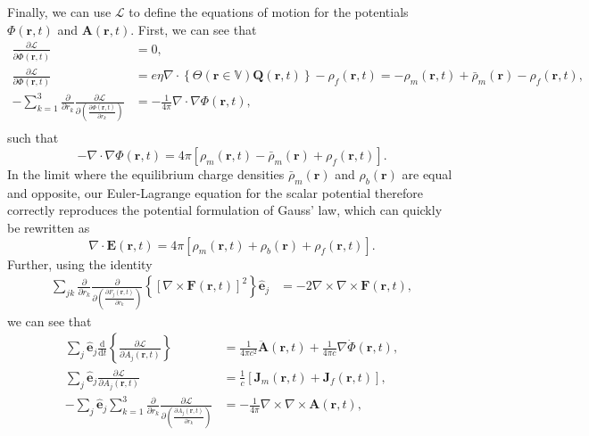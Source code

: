 \documentclass{article}
\begin{document}
Finally, we can use $\mathcal{L}$ to define the equations of motion for the potentials $\Phi(\mathbf{r},t)$ and $\mathbf{A}(\mathbf{r},t)$. First, we can see that 
\begin{equation}
\begin{split}
\frac{\partial\mathcal{L}}{\partial\dot{\Phi}(\mathbf{r},t)} &= 0,\\
\frac{\partial \mathcal{L}}{\partial \Phi(\mathbf{r},t)} &= e\eta\nabla\cdot\left\{\Theta(\mathbf{r}\in\mathbb{V})\mathbf{Q}(\mathbf{r},t)\right\} - \rho_f(\mathbf{r},t) = -\rho_m(\mathbf{r},t) + \bar{\rho}_m(\mathbf{r}) - \rho_f(\mathbf{r},t),\\
-\sum_{k = 1}^3\frac{\partial}{\partial r_k}\frac{\partial \mathcal{L}}{\partial\left(\frac{\partial\Phi(\mathbf{r},t)}{\partial r_k}\right)} &= -\frac{1}{4\pi}\nabla\cdot\nabla\Phi(\mathbf{r},t),\\
\end{split}
\end{equation}
such that
\begin{equation}\label{eq:poisson1}
-\nabla\cdot\nabla\Phi(\mathbf{r},t) = 4\pi\left[\rho_m(\mathbf{r},t) - \bar{\rho}_m(\mathbf{r}) + \rho_f(\mathbf{r},t)\right].
\end{equation}
In the limit where the equilibrium charge densities $\bar{\rho}_m(\mathbf{r})$ and $\rho_b(\mathbf{r})$ are equal and opposite, our Euler-Lagrange equation for the scalar potential therefore correctly reproduces the potential formulation of Gauss' law, which can quickly be rewritten as
\begin{equation}
\nabla\cdot\mathbf{E}(\mathbf{r},t) = 4\pi\left[\rho_m(\mathbf{r},t) + \rho_b(\mathbf{r}) + \rho_f(\mathbf{r},t)\right].
\end{equation}
Further, using the identity
\begin{equation}
\begin{split}
\sum_{jk}\frac{\partial}{\partial r_k}\frac{\partial}{\partial\!\left(\frac{\partial F_j(\mathbf{r},t)}{\partial r_k}\right)}\left\{\left[\nabla\times\mathbf{F}(\mathbf{r},t)\right]^2\right\}\hat{\mathbf{e}}_j &= -2\nabla\times\nabla\times\mathbf{F}(\mathbf{r},t),
\end{split}
\end{equation}
we can see that
\begin{equation}
\begin{split}
\sum_j\hat{\mathbf{e}}_j\frac{\mathrm{d}}{\mathrm{d}t}\left\{\frac{\partial\mathcal{L}}{\partial \dot{A}_j(\mathbf{r},t)}\right\} &= \frac{1}{4\pi c^2}\ddot{\mathbf{A}}(\mathbf{r},t) + \frac{1}{4\pi c}\nabla\dot{\Phi}(\mathbf{r},t),\\
\sum_j\hat{\mathbf{e}}_j\frac{\partial\mathcal{L}}{\partial A_j(\mathbf{r},t)} &= \frac{1}{c}\left[\mathbf{J}_m(\mathbf{r},t) + \mathbf{J}_f(\mathbf{r},t)\right],\\
-\sum_j\hat{\mathbf{e}}_j\sum_{k = 1}^3\frac{\partial}{\partial r_k}\frac{\partial \mathcal{L}}{\partial\!\left(\frac{\partial A_{j}(\mathbf{r},t)}{\partial r_k}\right)} &= -\frac{1}{4\pi}\nabla\times\nabla\times\mathbf{A}(\mathbf{r},t),
\end{split}
\end{equation}
\end{document}

